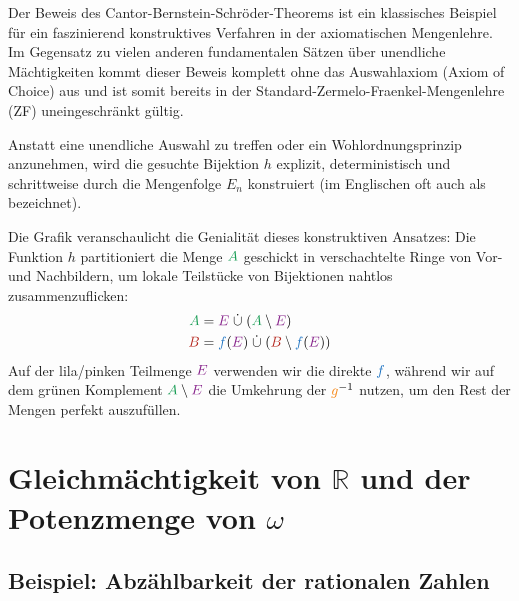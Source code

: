 \begin{didactic-insight}
Der Beweis des Cantor-Bernstein-Schröder-Theorems ist ein klassisches Beispiel für ein faszinierend konstruktives Verfahren in der axiomatischen Mengenlehre. Im Gegensatz zu vielen anderen fundamentalen Sätzen über unendliche Mächtigkeiten kommt dieser Beweis komplett ohne das Auswahlaxiom (Axiom of Choice) aus und ist somit bereits in der Standard-Zermelo-Fraenkel-Mengenlehre (ZF) uneingeschränkt gültig. 

Anstatt eine unendliche Auswahl zu treffen oder ein Wohlordnungsprinzip anzunehmen, wird die gesuchte Bijektion $h$ explizit, deterministisch und schrittweise durch die Mengenfolge $E_n$ konstruiert (im Englischen oft auch als  bezeichnet).

Die Grafik veranschaulicht die Genialität dieses konstruktiven Ansatzes: Die Funktion $h$ partitioniert die Menge $\textcolor{ForestGreen}{A}$ geschickt in verschachtelte Ringe von Vor- und Nachbildern, um lokale Teilstücke von Bijektionen nahtlos zusammenzuflicken:
\begin{align*}
  \textcolor{ForestGreen}{A} &= \textcolor{Fuchsia}{E} \;\dot{\cup}\; (\textcolor{ForestGreen}{A} \setminus \textcolor{Fuchsia}{E}) \\
  \textcolor{BrickRed}{B} &= \textcolor{RoyalBlue}{f}(\textcolor{Fuchsia}{E}) \;\dot{\cup}\; (\textcolor{BrickRed}{B} \setminus \textcolor{RoyalBlue}{f}(\textcolor{Fuchsia}{E}))
\end{align*}
Auf der lila/pinken Teilmenge $\textcolor{Fuchsia}{E}$ verwenden wir die direkte  $\textcolor{RoyalBlue}{f}$, während wir auf dem grünen Komplement $\textcolor{ForestGreen}{A} \setminus \textcolor{Fuchsia}{E}$ die Umkehrung der  $\textcolor{BurntOrange}{g}^{-1}$ nutzen, um den Rest der Mengen perfekt auszufüllen.
\end{didactic-insight}

\section{Gleichmächtigkeit von \texorpdfstring{$\mathbb{R}$}{R} und der Potenzmenge von \texorpdfstring{$\omega$}{omega}}

\subsection{Beispiel: Abzählbarkeit der rationalen Zahlen}


